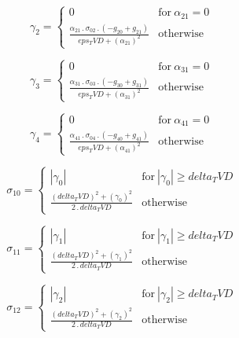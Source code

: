 \documentclass{article}
\begin{document}
\begin{dmath}\gamma_{2} = \begin{cases} 0 & \text{for}\: \alpha_{21} = 0 \\\frac{\alpha_{21} \,.\, \sigma_{0 2} \,.\, \left(- g_{20} + g_{21}\right)}{eps_TVD + \left(\alpha_{21} \right)^{2}} & \text{otherwise} \end{cases}\end{dmath}

\begin{dmath}\gamma_{3} = \begin{cases} 0 & \text{for}\: \alpha_{31} = 0 \\\frac{\alpha_{31} \,.\, \sigma_{0 3} \,.\, \left(- g_{30} + g_{31}\right)}{eps_TVD + \left(\alpha_{31} \right)^{2}} & \text{otherwise} \end{cases}\end{dmath}

\begin{dmath}\gamma_{4} = \begin{cases} 0 & \text{for}\: \alpha_{41} = 0 \\\frac{\alpha_{41} \,.\, \sigma_{0 4} \,.\, \left(- g_{40} + g_{41}\right)}{eps_TVD + \left(\alpha_{41} \right)^{2}} & \text{otherwise} \end{cases}\end{dmath}

\begin{dmath}\sigma_{1 0} = \begin{cases} \left|{\gamma_{0}}\right| & \text{for}\: \left|{\gamma_{0}}\right| \geq delta_TVD \\\frac{\left(delta_TVD \right)^{2} + \left(\gamma_{0} \right)^{2}}{2 \,.\, delta_TVD} & \text{otherwise} 
\end{cases}\end{dmath}

\begin{dmath}\sigma_{1 1} = \begin{cases} \left|{\gamma_{1}}\right| & \text{for}\: \left|{\gamma_{1}}\right| \geq delta_TVD \\\frac{\left(delta_TVD \right)^{2} + \left(\gamma_{1} \right)^{2}}{2 \,.\, delta_TVD} & \text{otherwise} 
\end{cases}\end{dmath}

\begin{dmath}\sigma_{1 2} = \begin{cases} \left|{\gamma_{2}}\right| & \text{for}\: \left|{\gamma_{2}}\right| \geq delta_TVD \\\frac{\left(delta_TVD \right)^{2} + \left(\gamma_{2} \right)^{2}}{2 \,.\, delta_TVD} & \text{otherwise} 
\end{cases}\end{dmath}
\end{document}
